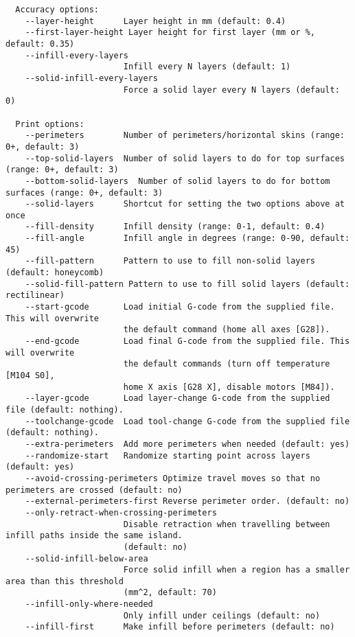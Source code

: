 \begin{verbatim}
  Accuracy options:
    --layer-height      Layer height in mm (default: 0.4)
    --first-layer-height Layer height for first layer (mm or %, default: 0.35)
    --infill-every-layers
                        Infill every N layers (default: 1)
    --solid-infill-every-layers
                        Force a solid layer every N layers (default: 0)

  Print options:
    --perimeters        Number of perimeters/horizontal skins (range: 0+, default: 3)
    --top-solid-layers  Number of solid layers to do for top surfaces (range: 0+, default: 3)
    --bottom-solid-layers  Number of solid layers to do for bottom surfaces (range: 0+, default: 3)
    --solid-layers      Shortcut for setting the two options above at once
    --fill-density      Infill density (range: 0-1, default: 0.4)
    --fill-angle        Infill angle in degrees (range: 0-90, default: 45)
    --fill-pattern      Pattern to use to fill non-solid layers (default: honeycomb)
    --solid-fill-pattern Pattern to use to fill solid layers (default: rectilinear)
    --start-gcode       Load initial G-code from the supplied file. This will overwrite
                        the default command (home all axes [G28]).
    --end-gcode         Load final G-code from the supplied file. This will overwrite
                        the default commands (turn off temperature [M104 S0],
                        home X axis [G28 X], disable motors [M84]).
    --layer-gcode       Load layer-change G-code from the supplied file (default: nothing).
    --toolchange-gcode  Load tool-change G-code from the supplied file (default: nothing).
    --extra-perimeters  Add more perimeters when needed (default: yes)
    --randomize-start   Randomize starting point across layers (default: yes)
    --avoid-crossing-perimeters Optimize travel moves so that no perimeters are crossed (default: no)
    --external-perimeters-first Reverse perimeter order. (default: no)
    --only-retract-when-crossing-perimeters
                        Disable retraction when travelling between infill paths inside the same island.
                        (default: no)
    --solid-infill-below-area
                        Force solid infill when a region has a smaller area than this threshold
                        (mm^2, default: 70)
    --infill-only-where-needed
                        Only infill under ceilings (default: no)
    --infill-first      Make infill before perimeters (default: no)


\end{verbatim}
